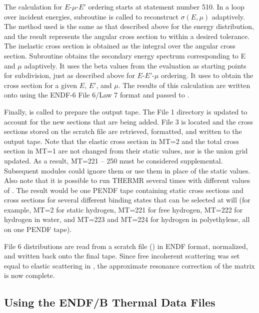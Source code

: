 The calculation for $E$-$\mu$-$E'$ ordering starts at statement number 510.
In a loop over incident energies, subroutine
 is called
to reconstruct $\sigma(E,\mu)$ adaptively.  The method used is
the same as that described above for the energy distribution, and
the result represents the angular cross section to within a desired
tolerance.  The inelastic cross section is obtained as the integral
over the angular cross section.  Subroutine  obtains
the secondary energy spectrum corresponding to E and $\mu$
adaptively.  It uses the beta values from the evaluation as
starting points for subdivision, just as described above for
$E$-$E'$-$\mu$ ordering.  It uses 
to obtain the cross section for a given $E$, $E'$, and $\mu$.
The results of this calculation are written onto  using
the ENDF-6 File 6/Law 7 format and passed to
.

Finally,  is called to prepare
the output tape.  The File 1 directory is updated to account for
the new sections that are being added.  File 3 is located and
the cross sections stored on the 
scratch file are retrieved, formatted, and written to the output tape.
Note that the elastic cross section in MT=2 and the total cross section in
MT=1 are not changed from their static values, nor is the union grid
updated.  As a result, MT=221 -- 250 must be considered supplemental.
Subsequent modules could ignore them or use them in place of the static
values.  Also note that it is possible to run THERMR several times with
different values of .  The result would be one PENDF tape
containing static cross sections and cross sections for several different
binding states that can be selected at will (for example, MT=2 for static
hydrogen, MT=221 for free hydrogen, MT=222 for hydrogen in water, and
MT=223 and MT=224 for hydrogen in polyethylene, all on one PENDF tape).

File 6 distributions are read from a scratch file ()
in ENDF format, normalized, and written back onto the final tape.
Since free incoherent scattering was set equal to elastic scattering
in , the approximate
resonance correction of the matrix is now complete.

\subsection{Using the ENDF/B Thermal Data Files}
\label{ssTHERMR_ENDF}

